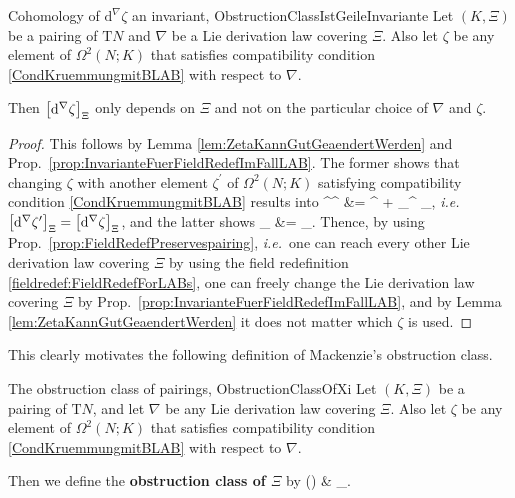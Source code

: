 \begin{theorems}{Cohomology of $\mathrm{d}^\nabla \zeta$ an invariant, \newline \cite[\S 7.2, Theorem 7.2.12, Mackenzie denotes $\mathrm{d}^\Xi$ with $\rho^\Xi$, $\zeta$ with $\Lambda$, $\mathrm{d}^\nabla \zeta$ with $f(\nabla, \Lambda)$, and replace $A$ with $\mathrm{T}N$; page 277]{mackenzieGeneralTheory}}{ObstructionClassIstGeileInvariante}
Let $(K, \Xi)$ be a pairing of $\mathrm{T}N$ and $\nabla$ be a Lie derivation law covering $\Xi$. Also let $\zeta$ be any element of  $\Omega^2(N; K)$ that satisfies compatibility condition \eqref{CondKruemmungmitBLAB} with respect to $\nabla$.

Then $\mleft[ \mathrm{d}^\nabla \zeta \mright]_\Xi$ only depends on $\Xi$ and not on the particular choice of $\nabla$ and $\zeta$.
\end{theorems}

\begin{proof}
\leavevmode\newline
This follows by Lemma \ref{lem:ZetaKannGutGeaendertWerden} and Prop.~\ref{prop:InvarianteFuerFieldRedefImFallLAB}. The former shows that changing $\zeta$ with another element $\zeta^\prime$ of $\Omega^2(N; K)$ satisfying compatibility condition \eqref{CondKruemmungmitBLAB} results into
\bas
{}^\nabla \zeta^\prime
&=
^\nabla \zeta
	+ _{^\Xi{}}
\in {}_\Xi,
\eas
\textit{i.e.} $\mleft[\mathrm{d}^\nabla \zeta^\prime\mright]_\Xi = \mleft[\mathrm{d}^\nabla \zeta \mright]_\Xi$, and the latter shows 
\bas
{}_\Xi
&=
_\Xi.
\eas
Thence, by using Prop.~\ref{prop:FieldRedefPreservespairing}, \textit{i.e.}~one can reach every other Lie derivation law covering $\Xi$ by using the field redefinition \ref{fieldredef:FieldRedefForLABs}, one can freely change the Lie derivation law covering $\Xi$ by Prop.~\ref{prop:InvarianteFuerFieldRedefImFallLAB}, and by Lemma \ref{lem:ZetaKannGutGeaendertWerden} it does not matter which $\zeta$ is used.
\end{proof}

This clearly motivates the following definition of Mackenzie's obstruction class.

\begin{definitions}{The obstruction class of pairings, \newline \cite[\S 7.2, comment after Theorem 7.2.12; page 277]{mackenzieGeneralTheory}}{ObstructionClassOfXi}
Let $(K, \Xi)$ be a pairing of $\mathrm{T}N$, and let $\nabla$ be any Lie derivation law covering $\Xi$. Also let $\zeta$ be any element of  $\Omega^2(N; K)$ that satisfies compatibility condition \eqref{CondKruemmungmitBLAB} with respect to $\nabla$.

Then we define the \textbf{obstruction class of $\Xi$} by
\ba
{}(\Xi)
&\coloneqq
{}_\Xi.
\ea
\end{definitions}

